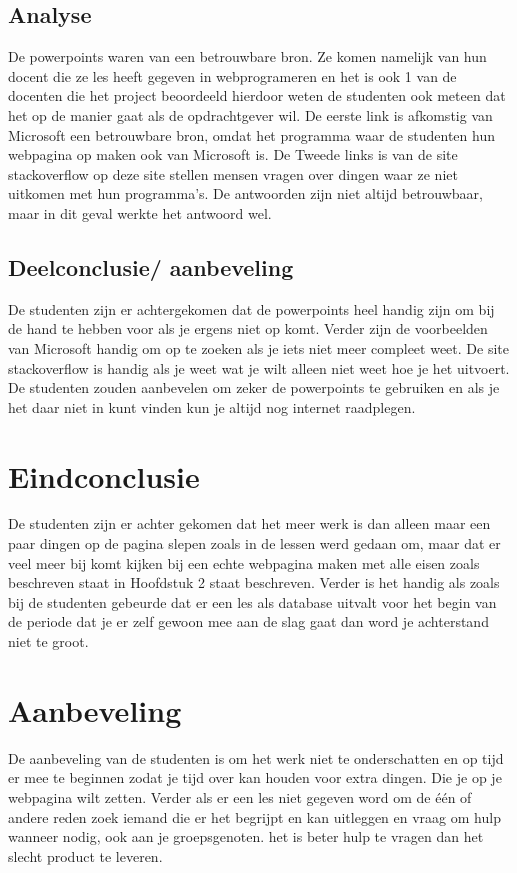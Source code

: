 \documentclass[11pt]{article}
\begin{document}
	\subsection{Analyse}
	De powerpoints waren van een betrouwbare bron. Ze komen namelijk van hun docent die ze les heeft gegeven in webprogrameren en het is ook 1 van de docenten die het project beoordeeld hierdoor weten de studenten ook meteen dat het op de manier gaat als de opdrachtgever wil. De eerste link is afkomstig van Microsoft een betrouwbare bron, omdat het programma waar de studenten hun webpagina op maken ook van Microsoft is. De Tweede links is van de site stackoverflow op deze site stellen mensen vragen over dingen waar ze niet uitkomen met hun programma's. De antwoorden zijn niet altijd betrouwbaar, maar in dit geval werkte het antwoord wel.

	\subsection{Deelconclusie/ aanbeveling}
	De studenten zijn er achtergekomen dat de powerpoints heel handig zijn om bij de hand te hebben voor als je ergens niet op komt. Verder zijn de voorbeelden van Microsoft handig om op te zoeken als je iets niet meer compleet weet. De site stackoverflow is handig als je weet wat je wilt alleen niet weet hoe je het uitvoert. De studenten zouden aanbevelen om zeker de powerpoints te gebruiken en als je het daar niet in kunt vinden kun je altijd nog internet raadplegen. 
	\newpage
	
	\section{Eindconclusie}
	De studenten zijn er achter gekomen dat het meer werk is dan alleen maar een paar dingen op de pagina slepen zoals in de lessen werd gedaan om, maar dat er veel meer bij komt kijken bij een echte webpagina maken met alle eisen zoals beschreven staat in Hoofdstuk 2 staat beschreven. Verder is het handig als zoals bij de studenten gebeurde dat er een les als database uitvalt voor het begin van de periode dat je er zelf gewoon mee aan de slag gaat dan word je achterstand niet te groot.
	
	
	\section{Aanbeveling}
	De aanbeveling van de studenten is om het werk niet te onderschatten en op tijd er mee te beginnen zodat je tijd over kan houden voor extra dingen. Die je op je webpagina wilt zetten. Verder als er een les niet gegeven word om de één of andere reden zoek iemand die er het begrijpt en kan uitleggen en vraag om hulp wanneer nodig, ook aan je groepsgenoten. het is beter hulp te vragen dan het slecht product te leveren.  
	
\end{document}
